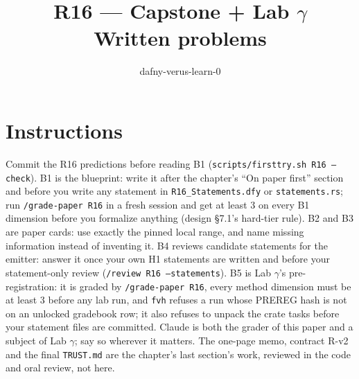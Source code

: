 \documentclass[11pt]{article}
\title{R16 --- Capstone + Lab $\gamma$ \\ \large Written problems}
\author{dafny-verus-learn-0}
\date{}
\begin{document}
\maketitle
\sloppy
\section*{Instructions}
Commit the R16 predictions before reading B1 (\texttt{scripts/firsttry.sh R16
--check}). B1 is the blueprint: write it after the chapter's ``On paper
first'' section and before you write any statement in
\texttt{R16\_Statements.dfy} or \texttt{statements.rs}; run
\texttt{/grade-paper R16} in a fresh session and get at least 3 on every B1
dimension before you formalize anything (design \S7.1's hard-tier rule). B2
and B3 are paper cards: use exactly the pinned local range, and name missing
information instead of inventing it. B4 reviews candidate statements for the
emitter: answer it once your own H1 statements are written and before your
statement-only review (\texttt{/review R16 --statements}). B5 is Lab
$\gamma$'s pre-registration: it is graded by \texttt{/grade-paper R16}, every
method dimension must be at least 3 before any lab run, and \texttt{fvh}
refuses a run whose PREREG hash is not on an unlocked gradebook row; it also
refuses to unpack the crate tasks before your statement files are committed.
Claude is both the grader of this paper and a subject of Lab $\gamma$; say so
wherever it matters. The one-page memo, contract R-v2 and the final
\texttt{TRUST.md} are the chapter's last section's work, reviewed in the code
and oral review, not here.
\end{document}
